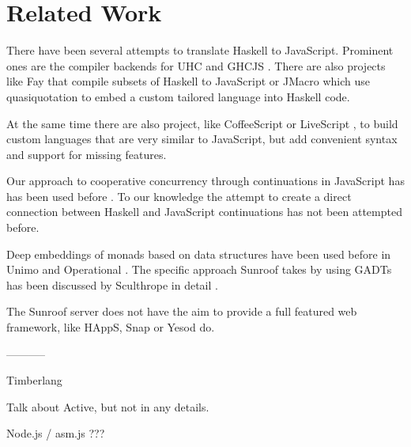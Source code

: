  
\section{Related Work}

There have been several attempts to translate Haskell to JavaScript.
Prominent ones are the compiler backends for 
UHC \cite{Stutterheim:12:ImprovingUHCJavaScriptBackend} and 
GHCJS \cite{project:ghcjs}. There are also projects like Fay \cite{project:fay} 
that compile subsets of Haskell to JavaScript or JMacro \cite{project:jmacro}
which use quasiquotation \cite{Mainland:07:QuasiquotingHaskell} to embed 
a custom tailored language into Haskell code.

At the same time there are also project, like 
CoffeeScript \cite{project:coffeescript} or LiveScript \cite{project:livescript},
to build custom languages 
that are very similar to JavaScript, but add convenient syntax and
support for missing features.

Our approach to cooperative concurrency through continuations in JavaScript has
has been used before 
\cite{Cooper:07:LinksWebProgrammingTiers,Predescu:02:CocoonContinuationBasedControlFlow}.
To our knowledge the attempt to create a direct connection
between Haskell and JavaScript continuations has not been 
attempted before.

Deep embeddings of monads based on data structures have been used before
in Unimo \cite{Lin:06:Unimo} and Operational \cite{Apfelmus:10:Operational,Hackage:10:Operational}. 
The specific approach Sunroof takes 
by using GADTs has been discussed by Sculthrope in detail 
\cite{Sculthorpe:13:ConstrainedMonads}.

The Sunroof server does not have the aim to provide a full featured 
web framework, like HAppS, Snap or Yesod do.


-----------

Timberlang

Talk about Active, but not in any details.


Node.js / asm.js ???





